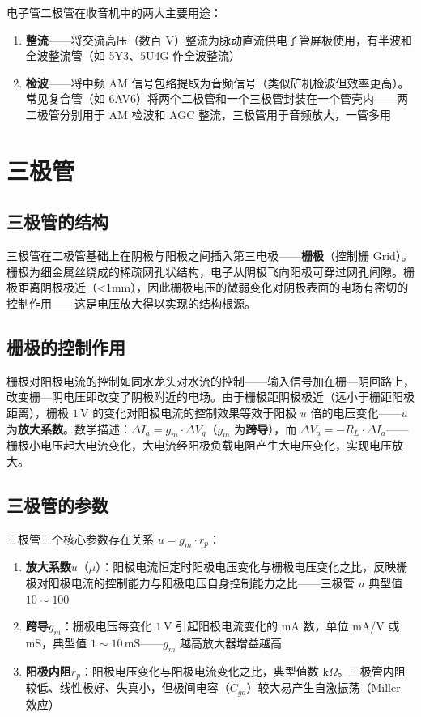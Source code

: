 \documentclass[12pt,UTF8]{ctexbook}
\begin{document}
电子管二极管在收音机中的两大主要用途：
\begin{enumerate}
\item \textbf{整流}——将交流高压（数百 V）整流为脉动直流供电子管屏极使用，有半波和全波整流管（如 5Y3、5U4G 作全波整流）
\item \textbf{检波}——将中频 AM 信号包络提取为音频信号（类似矿机检波但效率更高）。常见复合管（如 6AV6）将两个二极管和一个三极管封装在一个管壳内——两二极管分别用于 AM 检波和 AGC 整流，三极管用于音频放大，一管多用
\end{enumerate}

\section{三极管}
\label{sec:tube_triode}

\subsection{三极管的结构}

三极管在二极管基础上在阴极与阳极之间插入第三电极——\textbf{栅极}（控制栅 Grid）。栅极为细金属丝绕成的稀疏网孔状结构，电子从阴极飞向阳极可穿过网孔间隙。栅极距离阴极极近（<1mm），因此栅极电压的微弱变化对阴极表面的电场有密切的控制作用——这是电压放大得以实现的结构根源。

\subsection{栅极的控制作用}

栅极对阳极电流的控制如同水龙头对水流的控制——输入信号加在栅—阴回路上，改变栅—阴电压即改变了阴极附近的电场。由于栅极距阴极极近（远小于栅距阳极距离），栅极 $1\,\mathrm{V}$ 的变化对阳极电流的控制效果等效于阳极 $u$ 倍的电压变化——$u$ 为\textbf{放大系数}。数学描述：$\Delta I_a = g_m \cdot \Delta V_g$（$g_m$ 为\textbf{跨导}），而 $\Delta V_a = -R_L \cdot \Delta I_a$——栅极小电压起大电流变化，大电流经阳极负载电阻产生大电压变化，实现电压放大。

\subsection{三极管的参数}

三极管三个核心参数存在关系 $u = g_m \cdot r_p$：
\begin{enumerate}
\item \textbf{放大系数}$u$（$\mu$）：阳极电流恒定时阳极电压变化与栅极电压变化之比，反映栅极对阳极电流的控制能力与阳极电压自身控制能力之比——三极管 $u$ 典型值 $10\sim100$
\item \textbf{跨导}$g_m$：栅极电压每变化 $1\,\mathrm{V}$ 引起阳极电流变化的 mA 数，单位 mA/V 或 mS，典型值 $1\sim10\,\mathrm{mS}$——$g_m$ 越高放大器增益越高
\item \textbf{阳极内阻}$r_p$：阳极电压变化与阳极电流变化之比，典型值数 k$\Omega$。三极管内阻较低、线性极好、失真小，但极间电容（$C_{ga}$）较大易产生自激振荡（Miller 效应）
\end{enumerate}
\end{document}
